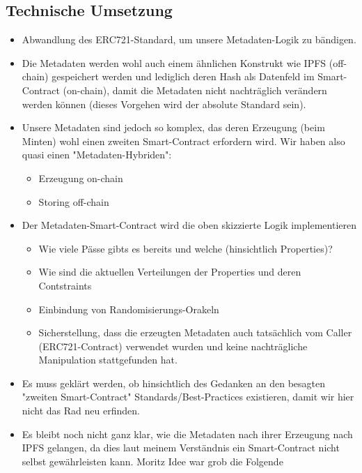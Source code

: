 
\subsection{Technische Umsetzung}

\vspace{0.3cm}


\vspace{0.3cm}

\begin{itemize}
  \item Abwandlung des ERC721-Standard, um unsere Metadaten-Logik zu bändigen.
  \item Die Metadaten werden wohl auch einem ähnlichen Konstrukt wie IPFS (off-chain) gespeichert werden und lediglich deren Hash als Datenfeld im Smart-Contract (on-chain), damit die Metadaten nicht nachträglich verändern werden können (dieses Vorgehen wird der absolute Standard sein).
  \item Unsere Metadaten sind jedoch so komplex, das deren Erzeugung (beim Minten) wohl einen zweiten Smart-Contract erfordern wird. Wir haben also quasi einen "Metadaten-Hybriden":
  \begin{itemize}
  	\item Erzeugung on-chain
  	\item Storing off-chain
  \end{itemize}
  \item Der Metadaten-Smart-Contract wird die oben skizzierte Logik implementieren
  \begin{itemize}
  	\item Wie viele Pässe gibts es bereits und welche (hinsichtlich Properties)?
  	\item Wie sind die aktuellen Verteilungen der Properties und deren Contstraints
  	\item Einbindung von Randomisierungs-Orakeln
  	\item Sicherstellung, dass die erzeugten Metadaten auch tatsächlich vom Caller (ERC721-Contract) verwendet wurden und keine nachträgliche Manipulation stattgefunden hat.
  \end{itemize}
  \item Es muss geklärt werden, ob hinsichtlich des Gedanken an den besagten "zweiten Smart-Contract" Standards/Best-Practices existieren, damit wir hier nicht das Rad neu erfinden.
  \item Es bleibt noch nicht ganz klar, wie die Metadaten nach ihrer Erzeugung nach IPFS gelangen, da dies laut meinem Verständnis ein Smart-Contract nicht selbst gewährleisten kann. Moritz Idee war grob die Folgende 

\end{itemize}

